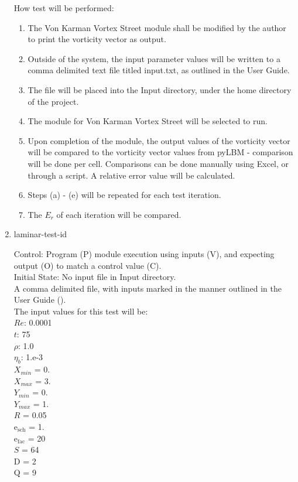 \documentclass[12pt, titlepage]{article}
\newcounter{testcounter} %
\begin{document}
\begin{enumerate}
How test will be performed: 

\begin{enumerate}
\item The Von Karman Vortex Street module shall be modified by the author to print the vorticity vector as output.
\item Outside of the system, the input parameter values will be written to a comma delimited text file titled input.txt, as outlined in the User Guide.
\item The file will be placed into the Input directory, under the home directory of the project.
\item The module for Von Karman Vortex Street will be selected to run.
\item Upon completion of the module, the output values of the vorticity vector will be compared to the vorticity vector values from pyLBM - comparison will be done per cell. Comparisons can be done manually using Excel, or through a script. A relative error value will be calculated.\\
\item Steps (a) - (e) will be repeated for each test iteration.
\item The $E_r$ of each iteration will be compared.\\
\end{enumerate}
					
\item{laminar-test-id\thetestcounter \\}

Control: Program (P) module execution using inputs (V), and expecting output (O) to match a control value (C).\\
					
Initial State: No input file in Input directory.\\
					
A comma delimited file, with inputs marked in the manner outlined in the User Guide (\citet{LBM_UserGuide_PM}).\\The input values for this test will be:\\
$Re$: 0.0001\\
$t$: 75\\
$\rho$: 1.0\\
$\eta_b$: 1.e-3\\
$X_{min}$ = 0.\\
$X_{max}$ = 3.\\
$Y_{min}$ = 0.\\
$Y_{max}$ = 1.\\
$R$ = 0.05\\
$\mathrm{e_{sch}}$ = 1.\\
$\mathrm{e_{fac}}$ = 20\\
$S$ = 64\\
$\mathrm{D}$ = 2\\
$\mathrm{Q}$ = 9\\
					

\end{enumerate}
\end{document}
